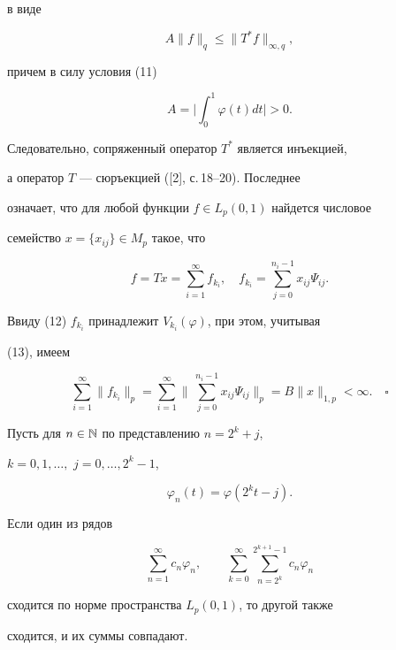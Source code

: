 в виде 


$$ 


A\|f\|_q\le\|T^*f\|_{\infty,q}, 


$$ 


причем в силу условия (11) 


$$ 


A=\bigg|\int^1_0\varphi(t)dt\bigg|>0. 


$$ 


Следовательно, сопряженный оператор $T^*$ является инъекцией,  


а оператор $T$ --- сюръекцией ([2], с.\,18--20). Последнее 


означает, что для любой функции $f\in L_p(0,1)$ найдется числовое 


семейство $x=\{x_{ij}\}\in M_p$ такое, что 


$$ 


f=T x=\sum^\infty_{i=1}f_{k_i},\quad 


f_{k_i}=\sum^{n_i-1}_{j=0}x_{ij}\Psi_{ij}. 


$$ 


Ввиду (12) $f_{k_i}$ принадлежит $V_{k_i}(\varphi)$, при этом, учитывая 


(13), имеем


$$ 


\sum^\infty_{i=1}\|f_{k_i}\|_p=\sum^\infty_{i=1}\bigg\|\, 


\sum^{n_i-1}_{j=0}x_{ij}\Psi_{ij}\bigg\|_p= 


B\|x\|_{1,p}<\infty.\quad\square 


$$ 


 


\begin{prop} Пусть для $n\in\Bbb N$ по представлению $n{=}2^k{+}j$, 


$k{=}0,1,\dotsc,$ $j{=}0,\dotsc,2^k{-}1$, 


\begin{equation} 


\varphi_n(t)=\varphi(2^k t-j). 


\end{equation} 


Если один из рядов 


\begin{equation} 


\sum^\infty_{n=1}c_n\varphi_n,\qquad 


\sum^\infty_{k=0}\sum^{2^{k+1}-1}_{n=2^k}c_n\varphi_n 


\end{equation} 


сходится по норме пространства $L_p(0,1)$, то другой также 


сходится, и их суммы совпадают. 


\end{prop} 


